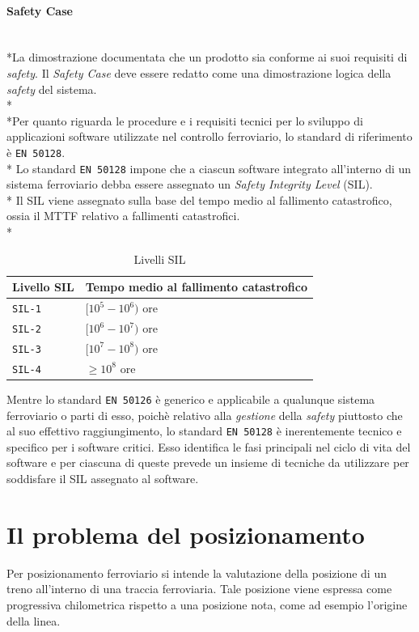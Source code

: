 \paragraph{Safety Case}\mbox{}\\*La dimostrazione documentata che un prodotto sia conforme ai suoi requisiti di \emph{safety}.
Il \emph{Safety Case} deve essere redatto come una dimostrazione logica della \emph{safety} del sistema.\\*\\*Per quanto riguarda le procedure e i requisiti tecnici per lo sviluppo di applicazioni software utilizzate nel controllo ferroviario, lo standard di riferimento \`e \texttt{EN 50128}. \cite{50128}\\*
Lo standard \texttt{EN 50128} impone che a ciascun software integrato all'interno di un sistema ferroviario debba essere assegnato un \emph{Safety Integrity Level} (SIL). \cite{sil}\\*
Il SIL viene assegnato sulla base del tempo medio al fallimento catastrofico, ossia il MTTF relativo a fallimenti catastrofici.\\*
\begin{table}[h]
	\centering
	\begin{tabular}{|l|l|}
		\hline 
		\textbf{Livello SIL} & \textbf{Tempo medio al fallimento catastrofico} \\ 
		\hline 
		\texttt{SIL-1} & $[10^5 - 10^6)$ ore \\ 
		\hline 
		\texttt{SIL-2} & $[10^6 - 10^7)$ ore \\ 
		\hline 
		\texttt{SIL-3} & $[10^7 - 10^8)$ ore \\ 
		\hline 
		\texttt{SIL-4} & $\ge 10^8$ ore \\ 
		\hline 
	\end{tabular} 
\caption{Livelli SIL}
\end{table}
\FloatBarrier
\noindent{}Mentre lo standard \texttt{EN 50126} \`e generico e applicabile a qualunque sistema ferroviario o parti di esso, poich\`e relativo alla \emph{gestione} della \emph{safety} piuttosto che al suo effettivo raggiungimento, lo standard \texttt{EN 50128} \`e inerentemente tecnico e specifico per i software critici. Esso identifica le fasi principali nel ciclo di vita del software e per ciascuna di queste prevede un insieme di tecniche da utilizzare per soddisfare il SIL assegnato al software.
\section{Il problema del posizionamento}
Per posizionamento ferroviario si intende la valutazione della posizione di un treno all'interno di una traccia ferroviaria. Tale posizione viene espressa come progressiva chilometrica rispetto a una posizione nota, come ad esempio l'origine della linea. \cite{trainpositioning}
